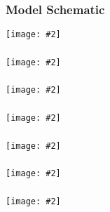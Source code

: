 \documentclass{beamer}
\newcommand{\plotslide}[2]{
  \begin{frame}
    \frametitle{#1}
    \texttt{[image: \#2]}
  \end{frame}
}
\begin{document}
\plotslide{Model Schematic}{../tikz/flow.pdf}

\plotslide{}{StotVsMAPKpp.pdf}

\plotslide{}{SmemVsp3.pdf}

\plotslide{}{InputVsMAPKpp.pdf}

\plotslide{}{InputVsMI.pdf}

\plotslide{}{ScaffoldVsMAPKppMI.pdf}

\plotslide{}{GradientVsMI.pdf}
\end{document}
